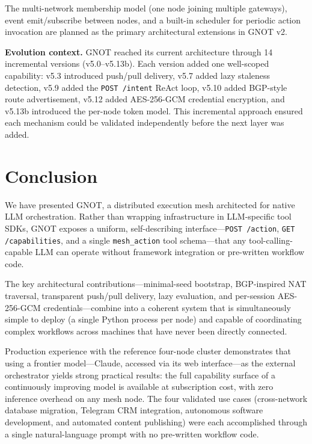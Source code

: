 \documentclass[10pt,twocolumn]{article}
\begin{document}
The multi-network membership model (one node joining multiple gateways),
event emit/subscribe between nodes, and a built-in scheduler for
periodic action invocation are planned as the primary architectural
extensions in GNOT v2.

\textbf{Evolution context.} GNOT reached its current architecture
through 14 incremental versions (v5.0--v5.13b). Each version added
one well-scoped capability: v5.3 introduced push/pull delivery, v5.7
added lazy staleness detection, v5.9 added the \texttt{POST /intent}
ReAct loop, v5.10 added BGP-style route advertisement, v5.12 added
AES-256-GCM credential encryption, and v5.13b introduced the per-node
token model. This incremental approach ensured each mechanism could be
validated independently before the next layer was added.

\section{Conclusion}
\label{sec:conclusion}

We have presented GNOT, a distributed execution mesh architected for
native LLM orchestration. Rather than wrapping infrastructure in
LLM-specific tool SDKs, GNOT exposes a uniform, self-describing
interface---\texttt{POST /action}, \texttt{GET /capabilities}, and a
single \texttt{mesh\_action} tool schema---that any tool-calling-capable
LLM can operate without framework integration or pre-written workflow
code.

The key architectural contributions---minimal-seed bootstrap,
BGP-inspired NAT traversal, transparent push/pull delivery, lazy
evaluation, and per-session AES-256-GCM credentials---combine into a
coherent system that is simultaneously simple to deploy (a single Python
process per node) and capable of coordinating complex workflows across
machines that have never been directly connected.

Production experience with the reference four-node cluster demonstrates
that using a frontier model---Claude, accessed via its web
interface---as the external orchestrator yields strong practical results:
the full capability surface of a continuously improving model is
available at subscription cost, with zero inference overhead on any mesh
node. The four validated use cases (cross-network database migration,
Telegram CRM integration, autonomous software development, and automated
content publishing) were each accomplished through a single
natural-language prompt with no pre-written workflow code.
\end{document}
